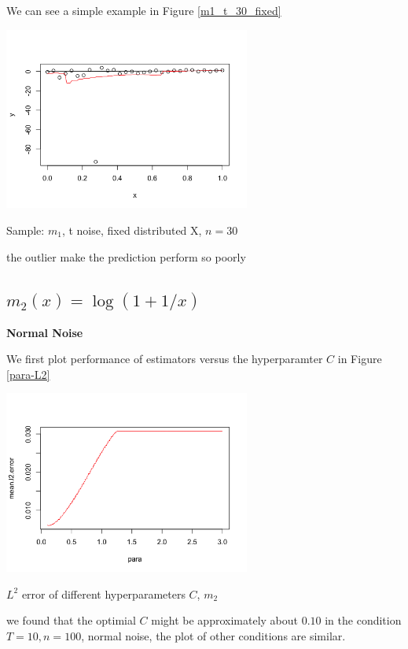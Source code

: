 \documentclass[twoside]{article}
\begin{document}
We can see a simple example in Figure \ref{m1_t_30_fixed}

\begin{center}
\makeatletter
\def\@captype{figure}
\makeatother
\includegraphics [height=6cm]{code/m1_t_30_fixed.png}
\caption{Sample: $m_1$, t noise, fixed distributed X, $n=30$}
\label{m1_t_30_fixed}
\end{center}

the outlier make the prediction perform so poorly

\subsection{$m_2(x)=\log(1+1/x)$}

\noindent \textbf{Normal Noise}

We first plot performance of estimators versus the hyperparamter $C$ in Figure \ref{para-L2}

\begin{center}
\makeatletter
\def\@captype{figure}
\makeatother
\includegraphics [height=6cm]{code/para_m2.png}
\caption{$L^2$ error of different hyperparameters $C$, $m_2$}
\label{para-L2}
\end{center}

we found that the optimial $C$ might be approximately about $0.10$ in the condition $T=10, n=100$, normal noise, the plot of other conditions are similar.
\end{document}
